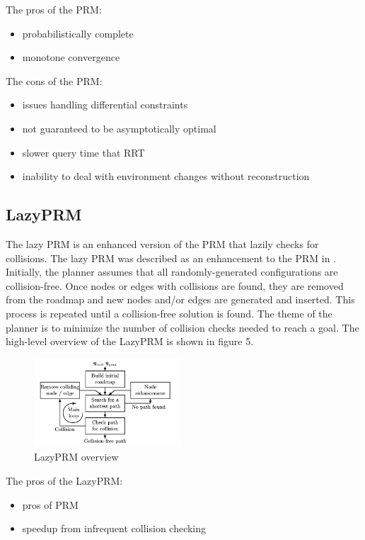 \documentclass[conference]{IEEEtran} \usepackage[T1]{fontenc} \usepackage[backend=biber, style=ieee]{biblatex}
\begin{document}
The pros of the PRM:
\begin{itemize}
\item probabilistically complete
\item monotone convergence
\end{itemize}

The cons of the PRM:
\begin{itemize}
\item issues handling differential constraints
\item not guaranteed to be asymptotically optimal
\item slower query time that RRT
\item inability to deal with environment changes without reconstruction
\end{itemize}

\subsection{LazyPRM} \label{LazyPRM}
The lazy PRM is an enhanced version of the PRM that lazily checks for collisions. The lazy PRM was described as an enhancement to the PRM in \cite{lazy_prm}. Initially, 
the planner assumes that all randomly-generated configurations are collision-free. Once nodes or edges with collisions are found, they are removed from the roadmap and
new nodes and/or edges are generated and inserted. This process is repeated until a collision-free solution is found. The theme of the planner is to minimize the number
of collision checks needed to reach a goal. The high-level overview of the LazyPRM is shown in figure 5.

\begin{figure}
\label{figure5} 
\centering 
\includegraphics[width=0.49\textwidth]{lazy_prm}
\caption{LazyPRM overview}
\end{figure}

The pros of the LazyPRM:
\begin{itemize}
\item pros of PRM
\item speedup from infrequent collision checking
\end{itemize}
\end{document}
